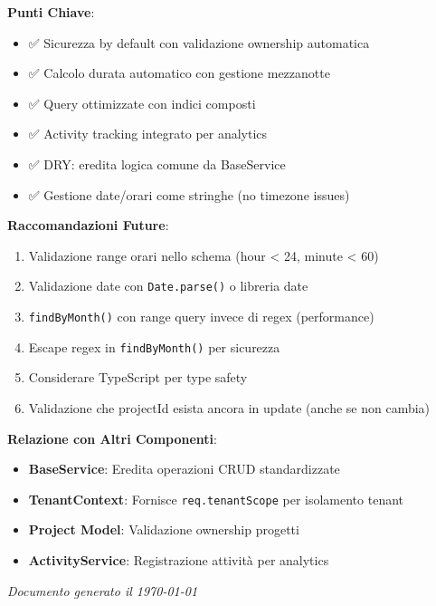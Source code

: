 \documentclass[11pt,a4paper]{article}
\begin{document}
\textbf{Punti Chiave}:
\begin{itemize}
    \item ✅ Sicurezza by default con validazione ownership automatica
    \item ✅ Calcolo durata automatico con gestione mezzanotte
    \item ✅ Query ottimizzate con indici composti
    \item ✅ Activity tracking integrato per analytics
    \item ✅ DRY: eredita logica comune da BaseService
    \item ✅ Gestione date/orari come stringhe (no timezone issues)
\end{itemize}

\textbf{Raccomandazioni Future}:
\begin{enumerate}
    \item Validazione range orari nello schema (hour < 24, minute < 60)
    \item Validazione date con \texttt{Date.parse()} o libreria date
    \item \texttt{findByMonth()} con range query invece di regex (performance)
    \item Escape regex in \texttt{findByMonth()} per sicurezza
    \item Considerare TypeScript per type safety
    \item Validazione che projectId esista ancora in update (anche se non cambia)
\end{enumerate}

\textbf{Relazione con Altri Componenti}:
\begin{itemize}
    \item \textbf{BaseService}: Eredita operazioni CRUD standardizzate
    \item \textbf{TenantContext}: Fornisce \texttt{req.tenantScope} per isolamento tenant
    \item \textbf{Project Model}: Validazione ownership progetti
    \item \textbf{ActivityService}: Registrazione attività per analytics
\end{itemize}

\vspace{1cm}

\textit{Documento generato il \today}
\end{document}

